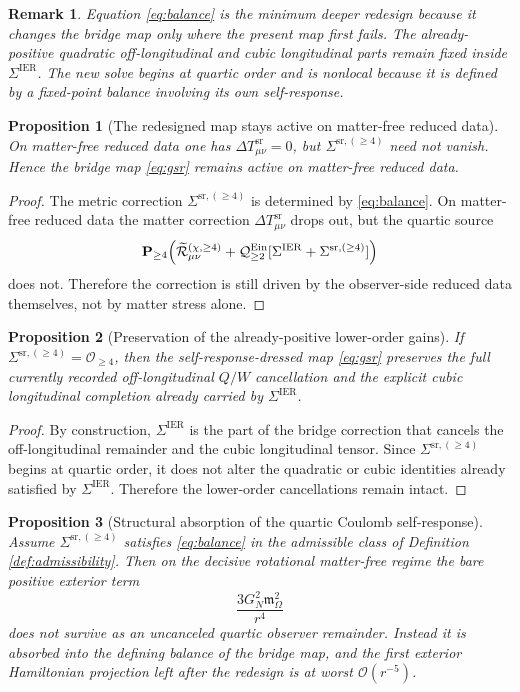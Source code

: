 \documentclass[11pt]{article}
\newcommand{\SigmaIER}{\Sigma^{\mathrm{IER}}}
\newcommand{\SigmaSRFour}{\Sigma^{\mathrm{sr},(\ge 4)}}
\newcommand{\ReLongFour}{\widetilde{\mathcal R}_{\mu\nu}^{(\chi,\ge 4)}}
\newcommand{\EinQuad}{\mathcal Q_{\ge 2}^{\mathrm{Ein}}}
\newcommand{\Pfour}{\mathbf P_{\ge 4}}
\newcommand{\HamChargeOmega}{\mathfrak m_{\Omega}}
\newcommand{\DeltaTSR}{\Delta T_{\mu\nu}^{\mathrm{sr}}}
\newtheorem{proposition}{Proposition}
\newtheorem{remark}{Remark}
\begin{document}
\begin{remark}
Equation \eqref{eq:balance} is the minimum deeper redesign because it changes the bridge map only where the present map first fails. The already-positive quadratic off-longitudinal and cubic longitudinal parts remain fixed inside \(\SigmaIER\). The new solve begins at quartic order and is nonlocal because it is defined by a fixed-point balance involving its own self-response.
\end{remark}

\begin{proposition}[The redesigned map stays active on matter-free reduced data]
\label{prop:matterfree}
On matter-free reduced data one has \(\DeltaTSR=0\), but \(\SigmaSRFour\) need not vanish. Hence the bridge map \eqref{eq:gsr} remains active on matter-free reduced data.
\end{proposition}

\begin{proof}
The metric correction \(\SigmaSRFour\) is determined by \eqref{eq:balance}. On matter-free reduced data the matter correction \(\DeltaTSR\) drops out, but the quartic source
\[
\Pfour\Bigl(\ReLongFour+\EinQuad[\SigmaIER+\SigmaSRFour]\Bigr)
\]
does not. Therefore the correction is still driven by the observer-side reduced data themselves, not by matter stress alone.
\end{proof}

\begin{proposition}[Preservation of the already-positive lower-order gains]
\label{prop:preserve}
If \(\SigmaSRFour=\mathcal O_{\ge 4}\), then the self-response-dressed map \eqref{eq:gsr} preserves the full currently recorded off-longitudinal \(Q/W\) cancellation and the explicit cubic longitudinal completion already carried by \(\SigmaIER\).
\end{proposition}

\begin{proof}
By construction, \(\SigmaIER\) is the part of the bridge correction that cancels the off-longitudinal remainder and the cubic longitudinal tensor. Since \(\SigmaSRFour\) begins at quartic order, it does not alter the quadratic or cubic identities already satisfied by \(\SigmaIER\). Therefore the lower-order cancellations remain intact.
\end{proof}

\begin{proposition}[Structural absorption of the quartic Coulomb self-response]
\label{prop:absorb}
Assume \(\SigmaSRFour\) satisfies \eqref{eq:balance} in the admissible class of Definition \ref{def:admissibility}. Then on the decisive rotational matter-free regime the bare positive exterior term
\[
\frac{3G_N^2\HamChargeOmega^2}{r^4}
\]
does not survive as an uncanceled quartic observer remainder. Instead it is absorbed into the defining balance of the bridge map, and the first exterior Hamiltonian projection left after the redesign is at worst \(\mathcal O(r^{-5})\).
\end{proposition}
\end{document}
